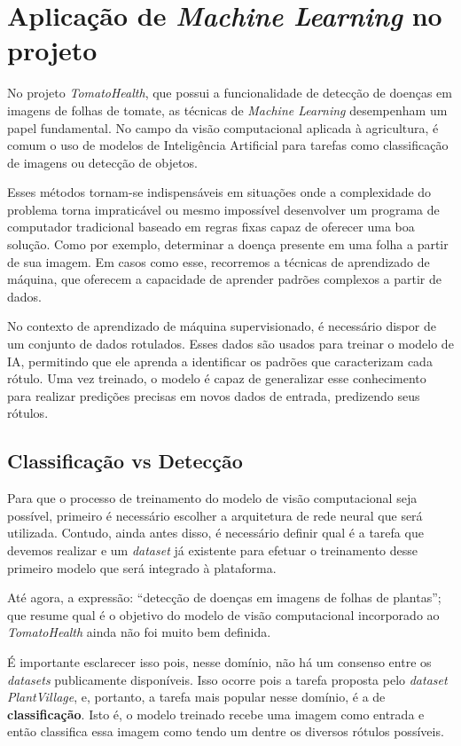 \section{Aplicação de \emph{Machine Learning} no projeto}
No projeto \emph{TomatoHealth}, que possui a funcionalidade de detecção de doenças em imagens de folhas de tomate, as técnicas de \emph{Machine Learning} desempenham um papel fundamental. No campo da visão computacional aplicada à agricultura, é comum o uso de modelos de Inteligência Artificial para tarefas como classificação de imagens ou detecção de objetos.

Esses métodos tornam-se indispensáveis em situações onde a complexidade do problema torna impraticável ou mesmo impossível desenvolver um programa de computador tradicional baseado em regras fixas capaz de oferecer uma boa solução. Como por exemplo, determinar a doença presente em uma folha a partir de sua imagem. Em casos como esse, recorremos a técnicas de aprendizado de máquina, que oferecem a capacidade de aprender padrões complexos a partir de dados.

No contexto de aprendizado de máquina supervisionado, é necessário dispor de um conjunto de dados rotulados. Esses dados são usados para treinar o modelo de IA, permitindo que ele aprenda a identificar os padrões que caracterizam cada rótulo. Uma vez treinado, o modelo é capaz de generalizar esse conhecimento para realizar predições precisas em novos dados de entrada, predizendo seus rótulos.

\subsection{Classificação vs Detecção}
Para que o processo de treinamento do modelo de visão computacional seja possível, primeiro é necessário escolher a arquitetura de rede neural que será utilizada. Contudo, ainda antes disso, é necessário definir qual é a tarefa que devemos realizar e um \emph{dataset} já existente para efetuar o treinamento desse primeiro modelo que será integrado à plataforma.

Até agora, a expressão: ``detecção de doenças em imagens de folhas de plantas''; que resume qual é o objetivo do modelo de visão computacional incorporado ao \emph{TomatoHealth} ainda não foi muito bem definida.

É importante esclarecer isso pois, nesse domínio, não há um consenso entre os \emph{datasets} publicamente disponíveis. Isso ocorre pois a tarefa proposta pelo \emph{dataset PlantVillage}, e, portanto, a tarefa mais popular nesse domínio, é a de {\bf classificação}. Isto é, o modelo treinado recebe uma imagem como entrada e então classifica essa imagem como tendo um dentre os diversos rótulos possíveis.

